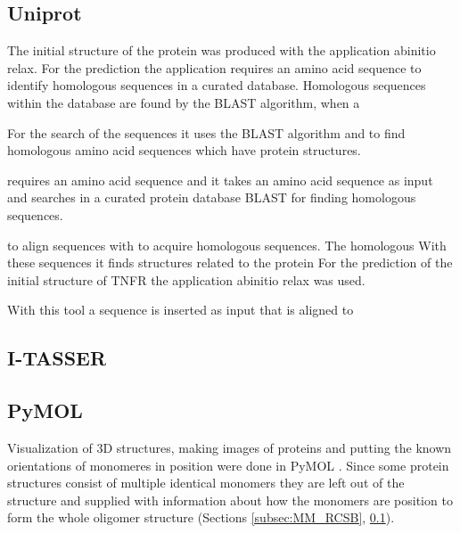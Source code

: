\subsection{Uniprot}
\label{subsec:MM_Uniprot}




 The initial structure of the protein was produced with the application abinitio relax. For the prediction the application requires an amino acid sequence to identify homologous sequences in a curated database. Homologous sequences within the database are found by the BLAST algorithm, when a

For the search of the sequences it uses the BLAST algorithm and to find homologous amino acid sequences which have protein structures.

requires an amino acid sequence and  it takes an amino acid sequence as input and searches in a curated protein database BLAST for finding homologous sequences. 


to align sequences with to acquire homologous sequences.  The homologous With these sequences it finds structures related to the protein
For the prediction of the initial structure of TNFR the application abinitio relax was used. 

With this tool a sequence is inserted as input that is aligned to 
 


\subsection{I-TASSER}
\label{subsec:MM_I_TASSER}

\subsection{PyMOL}
Visualization of 3D structures, making images of proteins and putting the known orientations of monomeres in position  were done in PyMOL \cite{}.
Since some protein structures consist of multiple identical monomers they are left out of the structure and supplied with information about how the monomers are position to form the whole oligomer structure (Sections \ref{subsec:MM_RCSB}, \ref{subsec:MM_Uniprot}).
\label{subsec:MM_PyMOL}

